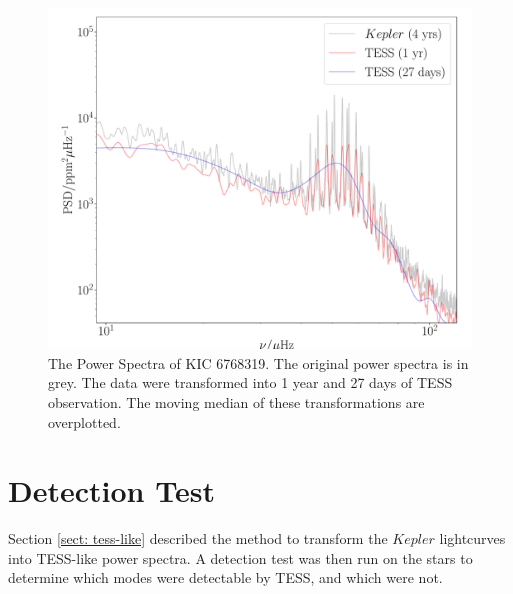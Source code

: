 \documentclass[a4paper,fleqn,usenatbib,useAMS]{mnras}
\newcommand{\kep}{\ensuremath{Kepler}\:}
\begin{document}
\begin{figure}
	\centering
	\includegraphics[scale=0.25]{diagnostic_plot4_modes}
	\caption{The Power Spectra of KIC 6768319. The original power spectra is in grey. The data were transformed into 1 year and 27 days of TESS observation. The moving median of these transformations are overplotted.}	
	\label{overplotted PS}
\end{figure} 

\section{Detection Test}
\label{sect: det_test}

Section \ref{sect: tess-like} described the method to transform the $Kepler$ lightcurves into TESS-like power spectra. A detection test was then run on the stars to determine which modes were detectable by TESS, and which were not.
\end{document}

